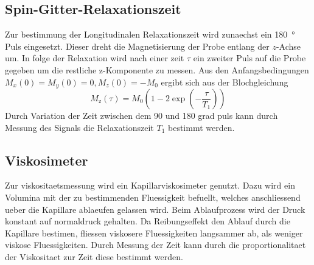 \subsection{Spin-Gitter-Relaxationszeit}%
\label{sub:spin_gitter_relaxationszeit}
Zur bestimmung der Longitudinalen Relaxationszeit wird zunaechst ein
\SI{180}{\degree}
Puls eingesetzt. 
Dieser dreht die Magnetisierung der Probe entlang der $z$-Achse um.
In folge der Relaxation wird nach einer zeit $\tau$ ein zweiter Puls auf die
Probe gegeben um die restliche z-Komponente zu messen. 
Aus den Anfangsbedingungen $M_x(0) = M_y(0) =0, M_z(0)=-M_0$ ergibt sich aus der
Blochgleichung 
\begin{equation}
		\label{eq:magn}
		M_\text{z}(\tau) = M_0 \left(1 - 2 \exp \left(- \frac{\tau}{T_1} \right)
		\right)
\end{equation}
Durch Variation der Zeit zwischen dem 90 und 180 grad puls kann durch Messung
des Signals die Relaxationszeit $T_1$ bestimmt werden.

\subsection{Viskosimeter}%
\label{sub:viskosimeter}
Zur viskositaetsmessung wird ein Kapillarviskosimeter genutzt. 
Dazu wird ein Volumina mit der zu bestimmenden Fluessigkeit befuellt, welches
anschliessend ueber die Kapillare ablaeufen gelassen wird.
Beim Ablaufprozess wird der Druck konstant auf normaldruck gehalten. 
Da Reibungseffekt den Ablauf durch die Kapillare bestimen, fliessen viskosere
Fluessigkeiten langsammer ab, als weniger viskose Fluessigkeiten.
Durch Messung der Zeit kann durch die proportionalitaet der Viskositaet zur Zeit
diese bestimmt werden.
